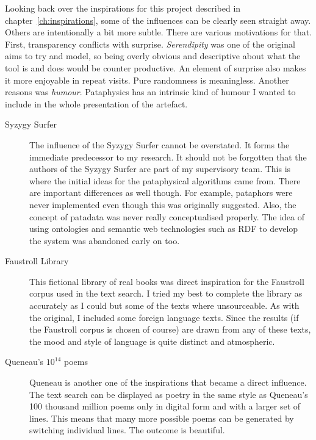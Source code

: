 Looking back over the inspirations for this project described in chapter~\ref{ch:inspirations}, some of the influences can be clearly seen straight away. Others are intentionally a bit more subtle. There are various motivations for that. First, transparency conflicts with surprise. \emph{Serendipity} was one of the original aims to try and model, so being overly obvious and descriptive about what the tool is and does would be counter productive. An element of surprise also makes it more enjoyable in repeat visits. Pure randomness is meaningless. Another reasons was \emph{humour}. Pataphysics has an intrinsic kind of humour I wanted to include in the whole presentation of the artefact. 

\begin{description}
  \item[Syzygy Surfer] The influence of the Syzygy Surfer cannot be overstated. It forms the immediate predecessor to my research. It should not be forgotten that the authors of the Syzygy Surfer are part of my supervisory team. This is where the initial ideas for the pataphysical algorithms came from. There are important differences as well though. For example, pataphors were never implemented even though this was originally suggested. Also, the concept of patadata was never really conceptualised properly. The idea of using ontologies and semantic web technologies such as \ac{RDF} to develop the system was abandoned early on too.
  \item[Faustroll Library] This fictional library of real books was direct inspiration for the Faustroll corpus used in the text search. I tried my best to complete the library as accurately as I could but some of the texts where unsourceable. As with the original, I included some foreign language texts. Since the results (if the Faustroll corpus is chosen of course) are drawn from any of these texts, the mood and style of language is quite distinct and atmospheric.
  \item[Queneau's $10^{14}$ poems] Queneau is another one of the inspirations that became a direct influence. The text search can be displayed as poetry in the same style as Queneau's \num{100} thousand million poems only in digital form and with a larger set of lines. This means that many more possible poems can be generated by switching individual lines. The outcome is beautiful.

\end{description}
